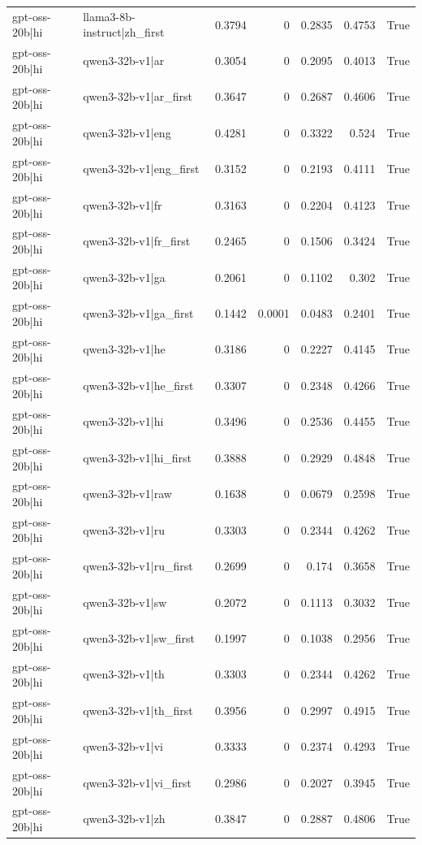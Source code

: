 \begin{table}
\begin{tabular}{l l r r r r l}
gpt-oss-20b|hi & llama3-8b-instruct|zh_first & 0.3794 & 0 & 0.2835 & 0.4753 & True \\
gpt-oss-20b|hi & qwen3-32b-v1|ar & 0.3054 & 0 & 0.2095 & 0.4013 & True \\
gpt-oss-20b|hi & qwen3-32b-v1|ar_first & 0.3647 & 0 & 0.2687 & 0.4606 & True \\
gpt-oss-20b|hi & qwen3-32b-v1|eng & 0.4281 & 0 & 0.3322 & 0.524 & True \\
gpt-oss-20b|hi & qwen3-32b-v1|eng_first & 0.3152 & 0 & 0.2193 & 0.4111 & True \\
gpt-oss-20b|hi & qwen3-32b-v1|fr & 0.3163 & 0 & 0.2204 & 0.4123 & True \\
gpt-oss-20b|hi & qwen3-32b-v1|fr_first & 0.2465 & 0 & 0.1506 & 0.3424 & True \\
gpt-oss-20b|hi & qwen3-32b-v1|ga & 0.2061 & 0 & 0.1102 & 0.302 & True \\
gpt-oss-20b|hi & qwen3-32b-v1|ga_first & 0.1442 & 0.0001 & 0.0483 & 0.2401 & True \\
gpt-oss-20b|hi & qwen3-32b-v1|he & 0.3186 & 0 & 0.2227 & 0.4145 & True \\
gpt-oss-20b|hi & qwen3-32b-v1|he_first & 0.3307 & 0 & 0.2348 & 0.4266 & True \\
gpt-oss-20b|hi & qwen3-32b-v1|hi & 0.3496 & 0 & 0.2536 & 0.4455 & True \\
gpt-oss-20b|hi & qwen3-32b-v1|hi_first & 0.3888 & 0 & 0.2929 & 0.4848 & True \\
gpt-oss-20b|hi & qwen3-32b-v1|raw & 0.1638 & 0 & 0.0679 & 0.2598 & True \\
gpt-oss-20b|hi & qwen3-32b-v1|ru & 0.3303 & 0 & 0.2344 & 0.4262 & True \\
gpt-oss-20b|hi & qwen3-32b-v1|ru_first & 0.2699 & 0 & 0.174 & 0.3658 & True \\
gpt-oss-20b|hi & qwen3-32b-v1|sw & 0.2072 & 0 & 0.1113 & 0.3032 & True \\
gpt-oss-20b|hi & qwen3-32b-v1|sw_first & 0.1997 & 0 & 0.1038 & 0.2956 & True \\
gpt-oss-20b|hi & qwen3-32b-v1|th & 0.3303 & 0 & 0.2344 & 0.4262 & True \\
gpt-oss-20b|hi & qwen3-32b-v1|th_first & 0.3956 & 0 & 0.2997 & 0.4915 & True \\
gpt-oss-20b|hi & qwen3-32b-v1|vi & 0.3333 & 0 & 0.2374 & 0.4293 & True \\
gpt-oss-20b|hi & qwen3-32b-v1|vi_first & 0.2986 & 0 & 0.2027 & 0.3945 & True \\
gpt-oss-20b|hi & qwen3-32b-v1|zh & 0.3847 & 0 & 0.2887 & 0.4806 & True \\

\end{tabular}
\end{table}

